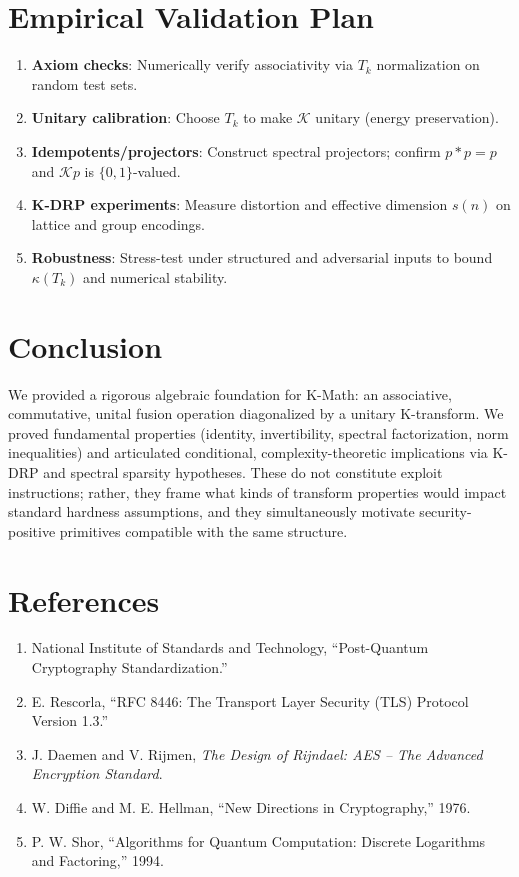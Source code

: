 \documentclass[11pt]{article}
\theoremstyle{plain}
\theoremstyle{definition}
\theoremstyle{remark}
\begin{document}
\section{Empirical Validation Plan}
\begin{enumerate}
    \item \textbf{Axiom checks}: Numerically verify associativity via $T_k$ normalization on random test sets.
    \item \textbf{Unitary calibration}: Choose $T_k$ to make $\mathcal{K}$ unitary (energy preservation).
    \item \textbf{Idempotents/projectors}: Construct spectral projectors; confirm $p \ast p = p$ and $\mathcal{K}p$ is $\{0,1\}$-valued.
    \item \textbf{K-DRP experiments}: Measure distortion and effective dimension $s(n)$ on lattice and group encodings.
    \item \textbf{Robustness}: Stress-test under structured and adversarial inputs to bound $\kappa(T_k)$ and numerical stability.
\end{enumerate}
\section{Conclusion}
We provided a rigorous algebraic foundation for K-Math: an associative, commutative, unital fusion operation diagonalized by a unitary K-transform. We proved fundamental properties (identity, invertibility, spectral factorization, norm inequalities) and articulated conditional, complexity-theoretic implications via K-DRP and spectral sparsity hypotheses. These do not constitute exploit instructions; rather, they frame what kinds of transform properties would impact standard hardness assumptions, and they simultaneously motivate security-positive primitives compatible with the same structure.
\section*{References}
\begin{enumerate}
    \item National Institute of Standards and Technology, ``Post-Quantum Cryptography Standardization.''
    \item E. Rescorla, ``RFC 8446: The Transport Layer Security (TLS) Protocol Version 1.3.''
    \item J. Daemen and V. Rijmen, \emph{The Design of Rijndael: AES -- The Advanced Encryption Standard}.
    \item W. Diffie and M. E. Hellman, ``New Directions in Cryptography,'' 1976.
    \item P. W. Shor, ``Algorithms for Quantum Computation: Discrete Logarithms and Factoring,'' 1994.
\end{enumerate}
\end{document}
